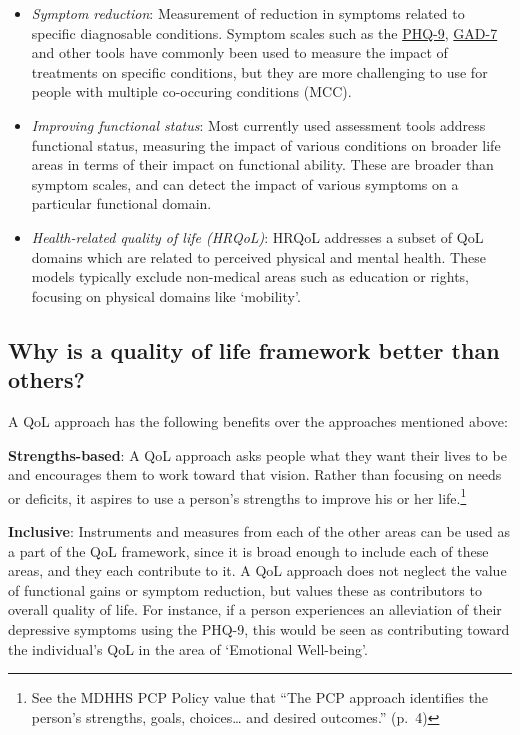 \documentclass[
]{book}
\providecommand{\tightlist}{%
  \setlength{\itemsep}{0pt}\setlength{\parskip}{0pt}}
\begin{document}
\begin{itemize}
\tightlist
\item
  \emph{Symptom reduction}: Measurement of reduction in symptoms related to specific diagnosable conditions. Symptom scales such as the \href{https://www.phqscreeners.com/sites/g/files/g10049256/f/201412/PHQ-9_English.pdf}{PHQ-9}, \href{}{GAD-7} and other tools have commonly been used to measure the impact of treatments on specific conditions, but they are more challenging to use for people with multiple co-occuring conditions (MCC).
\item
  \emph{Improving functional status}: Most currently used assessment tools address functional status, measuring the impact of various conditions on broader life areas in terms of their impact on functional ability. These are broader than symptom scales, and can detect the impact of various symptoms on a particular functional domain.
\item
  \emph{Health-related quality of life (HRQoL)}: HRQoL addresses a subset of QoL domains which are related to perceived physical and mental health. These models typically exclude non-medical areas such as education or rights, focusing on physical domains like `mobility'.
\end{itemize}

\hypertarget{why-is-a-quality-of-life-framework-better-than-others}{%
\subsection{Why is a quality of life framework better than others?}\label{why-is-a-quality-of-life-framework-better-than-others}}

A QoL approach has the following benefits over the approaches mentioned above:

\textbf{Strengths-based}: A QoL approach asks people what they want their lives to be and encourages them to work toward that vision. Rather than focusing on needs or deficits, it aspires to use a person's strengths to improve his or her life.\footnote{See the MDHHS PCP Policy value that ``The PCP approach identifies the person's strengths, goals, choices\ldots{} and desired outcomes.'' (p.~4)}

\textbf{Inclusive}: Instruments and measures from each of the other areas can be used as a part of the QoL framework, since it is broad enough to include each of these areas, and they each contribute to it. A QoL approach does not neglect the value of functional gains or symptom reduction, but values these as contributors to overall quality of life. For instance, if a person experiences an alleviation of their depressive symptoms using the PHQ-9, this would be seen as contributing toward the individual's QoL in the area of `Emotional Well-being'.
\end{document}
